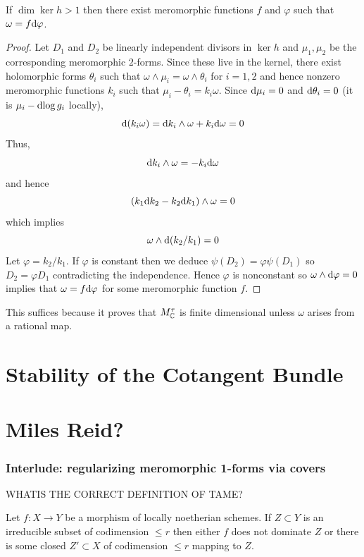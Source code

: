 \documentclass[main.tex]{subfiles}
\begin{document}
\begin{lemma}
If $\dim{\ker{h}} > 1$ then there exist meromorphic functions $f$ and $\varphi$ such that $\omega = f \mathrm{d}{\varphi}$.
\end{lemma}

\begin{proof}
Let $D_1$ and $D_2$ be linearly independent divisors in $\ker{h}$ and $\mu_1, \mu_2$ be the corresponding meromorphic $2$-forms. Since these live in the kernel, there exist holomorphic forms $\theta_i$ such that $\omega \wedge \mu_i = \omega \wedge \theta_i$ for $i = 1,2$ and hence nonzero meromorphic functions $k_i$ such that $\mu_i - \theta_i = k_i \omega$. Since $\mathrm{d}{\mu_i} = 0$ and $\mathrm{d}{\theta
_i} = 0$ (it is $\mu_i - \mathrm{d}{\log{g_i}}$ locally),
\[ \mathrm{d}(k_i \omega) = \mathrm{d}{k_i} \wedge \omega + k_i \mathrm{d}{\omega} = 0 \]
Thus,
\[ \mathrm{d}{k_i} \wedge \omega = - k_i \mathrm{d}{\omega} \]
and hence
\[ (k_1 \mathrm{d}{k_2} - k_2 \mathrm{d}{k_1}) \wedge \omega = 0 \]
which implies
\[ \omega \wedge \mathrm{d}{(k_2 / k_1)} = 0 \]
Let $\varphi = k_2 / k_1$. If $\varphi$ is constant then we deduce $\psi(D_2) = \varphi \psi(D_1)$ so $D_2 = \varphi D_1$ contradicting the independence. Hence $\varphi$ is nonconstant so $\omega \wedge \mathrm{d}{\varphi} = 0$ implies that $\omega = f \mathrm{d}{\varphi}$ for some meromorphic function $f$.
\end{proof}

This suffices because it proves that $M^{\tau}_{\mathbb{C}}$ is finite dimensional unless $\omega$ arises from a rational map.

\section{Stability of the Cotangent Bundle}



\section{Miles Reid?}

\subsubsection{Interlude: regularizing meromorphic 1-forms via covers}

{\color{red} WHATIS THE CORRECT DEFINITION OF TAME?}

\begin{lemma}
Let $f : X \to Y$ be a morphism of locally noetherian schemes. If $Z \subset Y$ is an irreducible subset of codimension $\le r$ then either $f$ does not dominate $Z$ or there is some closed $Z' \subset X$ of codimension $\le r$ mapping to $Z$.
\end{lemma}
\end{document}
